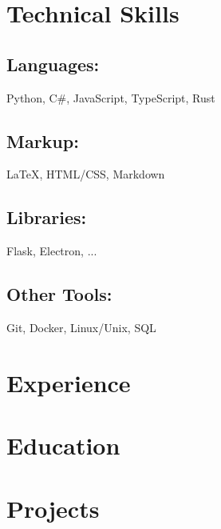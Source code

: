 \documentclass[11pt]{article}
\begin{document}
\thispagestyle{title}
\vspace*{25pt}


\section*{Technical Skills}
\subsection*{Languages:} Python, C\#, JavaScript, TypeScript, Rust

\subsection*{Markup:} {\LaTeX}, HTML/CSS, Markdown

\subsection*{Libraries:} Flask, Electron, ...
\subsection*{Other Tools:} Git, Docker, Linux/Unix, SQL

\section*{Experience}
\lipsum[1]

\newpage

\section*{Education}
\lipsum[1]

\section*{Projects}
\lipsum[1]
\end{document}
